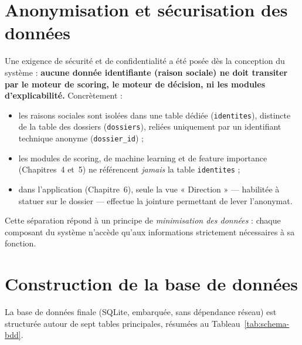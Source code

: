 \section{Anonymisation et sécurisation des données}

Une exigence de sécurité et de confidentialité a été posée dès la conception du système :
\textbf{aucune donnée identifiante (raison sociale) ne doit transiter par le moteur de scoring,
le moteur de décision, ni les modules d'explicabilité.} Concrètement :

\begin{itemize}
    \item les raisons sociales sont isolées dans une table dédiée (\texttt{identites}), distincte
    de la table des dossiers (\texttt{dossiers}), reliées uniquement par un identifiant technique
    anonyme (\texttt{dossier\_id}) ;
    \item les modules de scoring, de machine learning et de feature importance
    (Chapitres~4 et~5) ne référencent \emph{jamais} la table \texttt{identites} ;
    \item dans l'application (Chapitre~6), seule la vue « Direction » — habilitée à statuer sur
    le dossier — effectue la jointure permettant de lever l'anonymat.
\end{itemize}

Cette séparation répond à un principe de \emph{minimisation des données} : chaque composant du
système n'accède qu'aux informations strictement nécessaires à sa fonction.

\section{Construction de la base de données}

La base de données finale (SQLite, embarquée, sans dépendance réseau) est structurée autour de
sept tables principales, résumées au Tableau~\ref{tab:schema-bdd}.

